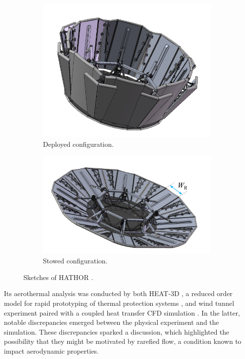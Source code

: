 \begin{figure}[ht]
    \centering
    \begin{subfigure}{0.43\textwidth}
        \centering
        \includegraphics[width=\textwidth]{../Images/1. Introduction/HathorStowed.png}
        \caption{Deployed configuration.}
    \end{subfigure}
    \hfill
    \begin{subfigure}{0.56\textwidth}
        \centering
        \includegraphics[width=\textwidth]{../Images/1. Introduction/HathorDeployed.png}  
        \caption{Stowed configuration.}
    \end{subfigure}
    \caption{Sketches of HATHOR \cite{hathoraero1}.}
    \label{fig:hathorsketch}
\end{figure}

Its aerothermal analysis was conducted by both HEAT-3D \cite{heat3d}, a reduced order model for rapid prototyping of thermal protection systems \cite{hathoraero1}, and wind tunnel experiment paired with a coupled heat transfer CFD simulation \cite{hathoraero2}. 
In the latter, notable discrepancies emerged between the physical experiment and the simulation. These discrepancies sparked a discussion, which highlighted the possibility that they might be motivated by rarefied flow, a condition known to impact aerodynamic properties. 

